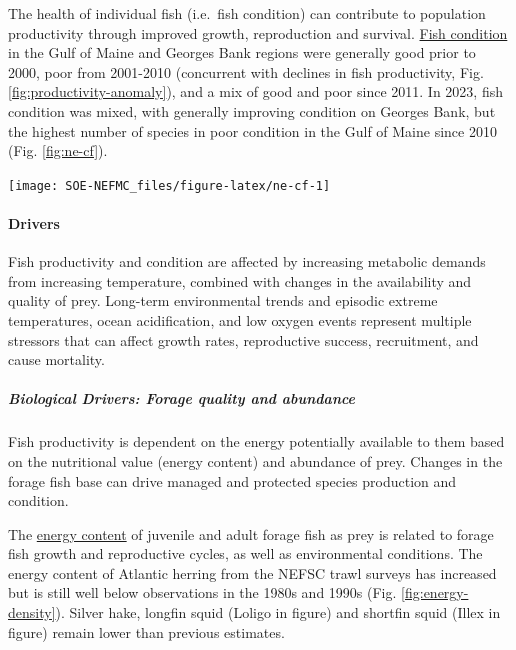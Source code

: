 \documentclass[
  10pt,
]{article}
\let\origfigure\figure
\let\endorigfigure\endfigure
\renewenvironment{figure}[1][2] {
    \expandafter\origfigure\expandafter[H]
} {
    \endorigfigure
}
\begin{document}
The health of individual fish (i.e.~fish condition) can contribute to population productivity through improved growth, reproduction and survival. \href{https://noaa-edab.github.io/catalog/relative-condition.html}{Fish condition} in the Gulf of Maine and Georges Bank regions were generally good prior to 2000, poor from 2001-2010 (concurrent with declines in fish productivity, Fig. \ref{fig:productivity-anomaly}), and a mix of good and poor since 2011. In 2023, fish condition was mixed, with generally improving condition on Georges Bank, but the highest number of species in poor condition in the Gulf of Maine since 2010 (Fig. \ref{fig:ne-cf}).

\begin{figure}

{\centering \texttt{[image: SOE-NEFMC\_files/figure-latex/ne-cf-1]} 

}

\caption{Condition factor for fish species in New England based on fall NEFSC bottom trawl survey data. No survey was conducted in 2020.}\label{fig:ne-cf}
\end{figure}

\hypertarget{drivers-2}{%
\paragraph{Drivers}\label{drivers-2}}

Fish productivity and condition are affected by increasing metabolic demands from increasing temperature, combined with changes in the availability and quality of prey. Long-term environmental trends and episodic extreme temperatures, ocean acidification, and low oxygen events represent multiple stressors that can affect growth rates, reproductive success, recruitment, and cause mortality.

\hypertarget{biological-drivers-forage-quality-and-abundance}{%
\subparagraph{Biological Drivers: Forage quality and abundance}\label{biological-drivers-forage-quality-and-abundance}}

Fish productivity is dependent on the energy potentially available to them based on the nutritional value (energy content) and abundance of prey. Changes in the forage fish base can drive managed and protected species production and condition.

The \href{https://noaa-edab.github.io/catalog/forage-fish-energy-density.html}{energy content} of juvenile and adult forage fish as prey is related to forage fish growth and reproductive cycles, as well as environmental conditions. The energy content of Atlantic herring from the NEFSC trawl surveys has increased but is still well below observations in the 1980s and 1990s (Fig. \ref{fig:energy-density}). Silver hake, longfin squid (Loligo in figure) and shortfin squid (Illex in figure) remain lower than previous estimates.
\end{document}
